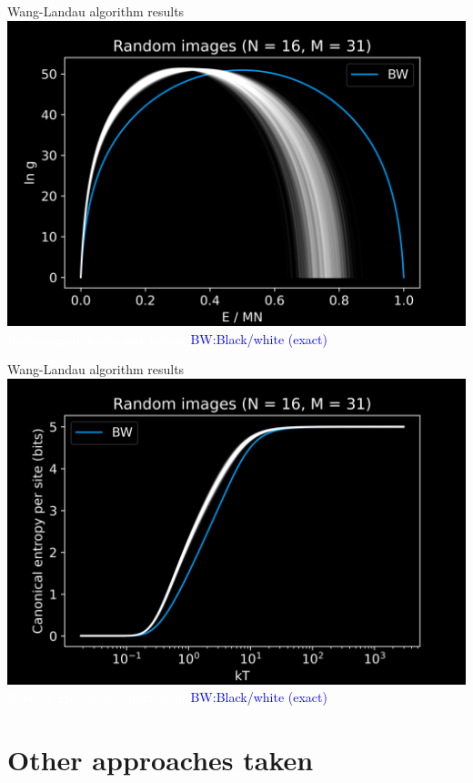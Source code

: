 \documentclass[14pt,c]{beamer}
\begin{document}
\begin{frame}{Wang-Landau algorithm results}
  \centering
  \includegraphics[width=0.9\framewidth]{wanglandau-gray}
  \\
  \small
  \textcolor{white}{Random gray image simulations} \;
  \textcolor{blue}{BW:\@ Black/white (exact)}
\end{frame}

\begin{frame}{Wang-Landau algorithm results}
  \centering
  \includegraphics[width=0.9\framewidth]{wanglandau-gray-S}
  \\
  \small
  \textcolor{white}{Random gray image simulations} \;
  \textcolor{blue}{BW:\@ Black/white (exact)}
\end{frame}

\section{Other approaches taken}
\end{document}
